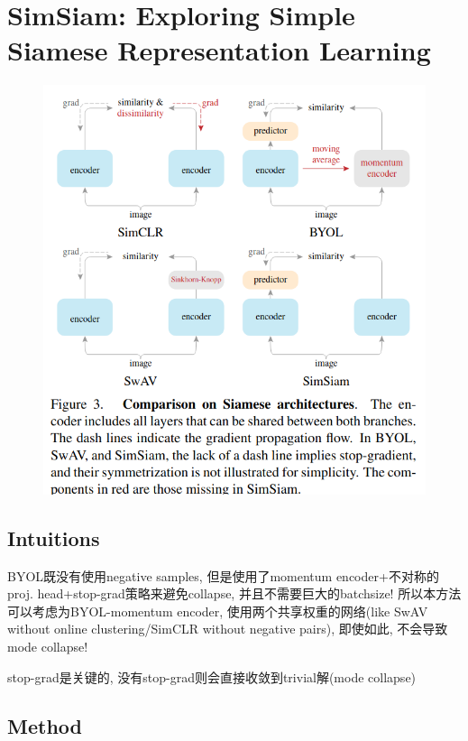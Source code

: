 \documentclass{article}
\begin{document}
\section{SimSiam: Exploring Simple Siamese Representation Learning}
\begin{figure}[htbp]
    \centering
    \includegraphics[width=\textwidth]{simsiam-comp.png}
\end{figure}
\subsection{Intuitions}

BYOL既没有使用negative samples, 但是使用了momentum encoder+不对称的proj. head+stop-grad策略来避免collapse, 并且不需要巨大的batchsize! 所以本方法可以考虑为BYOL-momentum encoder, 使用两个共享权重的网络(like SwAV without online clustering/SimCLR without negative pairs), 即使如此, 不会导致mode collapse!

\begin{remark}
    stop-grad是关键的, 没有stop-grad则会直接收敛到trivial解(mode collapse)
\end{remark}

\subsection{Method}
\end{document}
